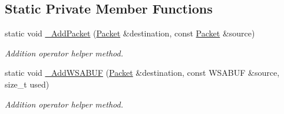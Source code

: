 \subsection*{Static Private Member Functions}
\begin{DoxyCompactItemize}
\item 
static void \hyperlink{class_packet_afcc7bfb21d45884b60d26036efa4f6cd}{\_\-AddPacket} (\hyperlink{class_packet}{Packet} \&destination, const \hyperlink{class_packet}{Packet} \&source)
\begin{DoxyCompactList}\small\item\em Addition operator helper method. \item\end{DoxyCompactList}\item 
static void \hyperlink{class_packet_ac4dee2aa279939236f3bea21d0fed88b}{\_\-AddWSABUF} (\hyperlink{class_packet}{Packet} \&destination, const WSABUF \&source, size\_\-t used)
\begin{DoxyCompactList}\small\item\em Addition operator helper method. \item\end{DoxyCompactList}\end{DoxyCompactItemize}
